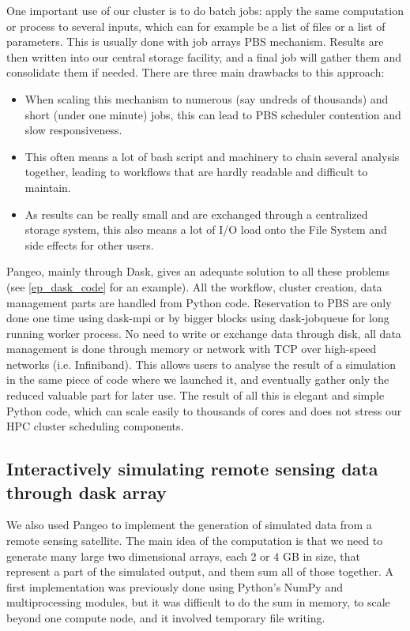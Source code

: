 \documentclass{article}
\begin{document}
One important use of our cluster is to do batch jobs: apply the same computation or process to several inputs, which can for example be a list of files or a list of parameters. This is usually done with job arrays PBS mechanism. Results are then written into our central storage facility, and a final job will gather them and consolidate them if needed. There are three main drawbacks to this approach:
\begin{itemize}
\item When scaling this mechanism to numerous (say undreds of thousands) and short (under one minute) jobs, this can lead to PBS scheduler contention and slow responsiveness.
\item This often means a lot of bash script and machinery to chain several analysis together, leading to workflows that are hardly readable and difficult to maintain.
\item As results can be really small and are exchanged through a centralized storage system, this also means a lot of I/O load onto the File System and side effects for other users.
\end{itemize}

Pangeo, mainly through Dask, gives an adequate solution to all these problems (see \ref{ep_dask_code} for an example). All the workflow, cluster creation, data management parts are handled from Python code. Reservation to PBS are only done one time using dask-mpi or by bigger blocks using dask-jobqueue for long running worker process. No need to write or exchange data through disk, all data management is done through memory or network with TCP over high-speed networks (i.e. Infiniband). This allows users to analyse the result of a simulation in the same piece of code where we launched it, and eventually gather only the reduced valuable part for later use. The result of all this is elegant and simple Python code, which can scale easily to thousands of cores and does not stress our HPC cluster scheduling components.

\subsection{Interactively simulating remote sensing data through dask array}
\label{ssec:usecase2}

We also used Pangeo to implement the generation of simulated data from a remote sensing satellite. The main idea of the computation is that we need to generate many large two dimensional arrays, each 2 or 4 GB in size, that represent a part of the simulated output, and them sum all of those together. A first implementation was previously done using Python's NumPy and multiprocessing modules, but it was difficult to do the sum in memory, to scale beyond one compute node, and it involved temporary file writing.
\end{document}
